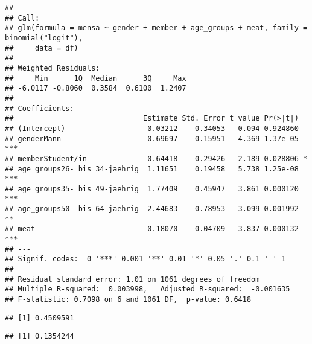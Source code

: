 \documentclass[
]{article}
\newenvironment{Shaded}{\begin{snugshade}}{\end{snugshade}}
\newcommand{\CommentTok}[1]{\textcolor[rgb]{0.56,0.35,0.01}{\textit{#1}}}
\newcommand{\DecValTok}[1]{\textcolor[rgb]{0.00,0.00,0.81}{#1}}
\newcommand{\KeywordTok}[1]{\textcolor[rgb]{0.13,0.29,0.53}{\textbf{#1}}}
\newcommand{\NormalTok}[1]{#1}
\newcommand{\OperatorTok}[1]{\textcolor[rgb]{0.81,0.36,0.00}{\textbf{#1}}}
\newcommand{\StringTok}[1]{\textcolor[rgb]{0.31,0.60,0.02}{#1}}
\begin{document}
\begin{verbatim}
## 
## Call:
## glm(formula = mensa ~ gender + member + age_groups + meat, family = binomial("logit"), 
##     data = df)
## 
## Weighted Residuals:
##     Min      1Q  Median      3Q     Max 
## -6.0117 -0.8060  0.3584  0.6100  1.2407 
## 
## Coefficients:
##                              Estimate Std. Error t value Pr(>|t|)    
## (Intercept)                   0.03212    0.34053   0.094 0.924860    
## genderMann                    0.69697    0.15951   4.369 1.37e-05 ***
## memberStudent/in             -0.64418    0.29426  -2.189 0.028806 *  
## age_groups26- bis 34-jaehrig  1.11651    0.19458   5.738 1.25e-08 ***
## age_groups35- bis 49-jaehrig  1.77409    0.45947   3.861 0.000120 ***
## age_groups50- bis 64-jaehrig  2.44683    0.78953   3.099 0.001992 ** 
## meat                          0.18070    0.04709   3.837 0.000132 ***
## ---
## Signif. codes:  0 '***' 0.001 '**' 0.01 '*' 0.05 '.' 0.1 ' ' 1
## 
## Residual standard error: 1.01 on 1061 degrees of freedom
## Multiple R-squared:  0.003998,   Adjusted R-squared:  -0.001635 
## F-statistic: 0.7098 on 6 and 1061 DF,  p-value: 0.6418
\end{verbatim}

\begin{Shaded}
\end{Shaded}

\begin{verbatim}
## [1] 0.4509591
\end{verbatim}

\begin{Shaded}
\end{Shaded}

\begin{verbatim}
## [1] 0.1354244
\end{verbatim}
\end{document}
